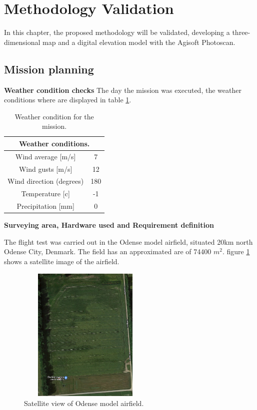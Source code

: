 \section{Methodology Validation}
In this chapter, the proposed methodology will be validated, developing a three-dimensional map and a digital elevation model with the Agisoft Photoscan.
\subsection{Mission planning}
\textbf{Weather condition checks}\newline
The day the mission was executed, the weather conditions where are  displayed in table \ref{Table:Weather}.
\begin{table}[H]
\centering
\begin{tabular}{|c|c|}
\hline
\multicolumn{2}{|c|}{Weather conditions.} \\ \hline
Wind average {[}m/s{]}         & 7        \\ \hline
Wind gusts {[}m/s{]}           & 12       \\ \hline
Wind direction (degrees)       & 180      \\ \hline
Temperature {[}c{]}            & -1       \\ \hline
Precipitation {[}mm{]}         & 0        \\ \hline
\end{tabular}
\caption{Weather condition for the mission.}
\label{Table:Weather}
\end{table}
\textbf{Surveying area, Hardware used and Requirement definition}\newline

The flight test was carried out in the Odense model airfield, situated 20km north Odense City, Denmark. The field has an approximated are of  74400 $m^2$. figure \ref{fig:Airfield} shows a satellite image of the airfield.
\begin{figure}[H]
\centering
\includegraphics[width=6.5cm,height=6.5cm,keepaspectratio]{imagenes/Satellite.png}
\caption{Satellite view of Odense model airfield.}
\label{fig:Airfield}
\end{figure}

